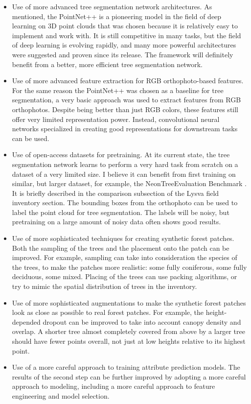 \begin{itemize}
\item Use of more advanced tree segmentation network architectures.
  As mentioned, the PointNet++ is a pioneering model in the field of deep learning on 3D point clouds that was chosen because it is relatively easy to implement and work with.
  It is still competitive in many tasks, but the field of deep learning is evolving rapidly, and many more powerful architectures were suggested and proven since its release.
  The framework will definitely benefit from a better, more efficient tree segmentation network.
\item Use of more advanced feature extraction for RGB orthophoto-based features.
  For the same reason the PointNet++ was chosen as a baseline for tree segmentation, a very basic approach was used to extract features from RGB orthophotos.
  Despite being better than just RGB colors, these features still offer very limited representation power.
  Instead, convolutional neural networks specialized in creating good representations for downstream tasks can be used.
\item Use of open-access datasets for pretraining.
  At its current state, the tree segmentation network learns to perform a very hard task from scratch on a dataset of a very limited size.
  I believe it can benefit from first training on similar, but larger dataset, for example, the NeonTreeEvaluation Benchmark \citep{weinsteinDataNeonTreeEvaluationBenchmark2022}.
  It is briefly described in the comparison subsection of the Lysva field inventory section.
  The bounding boxes from the orthophoto can be used to label the point cloud for tree segmentation.
  The labels will be noisy, but pretraining on a large amount of noisy data often shows good results.
\item Use of more sophisticated techniques for creating synthetic forest patches.
  Both the sampling of the trees and the placement onto the patch can be improved.
  For example, sampling can take into consideration the species of the trees, to make the patches more realistic: some fully coniferous, some fully deciduous, some mixed.
  Placing of the trees can use packing algorithms, or try to mimic the spatial distribution of trees in the inventory.
\item Use of more sophisticated augmentations to make the synthetic forest patches look as close as possible to real forest patches.
  For example, the height-depended dropout can be improved to take into account canopy density and overlap.
  A shorter tree almost completely covered from above by a larger tree should have fewer points overall, not just at low heights relative to its highest point.
\item Use of a more careful approach to training attribute prediction models.
The results of the second step can be further improved by adopting a more careful approach to modeling, including a more careful approach to feature engineering and model selection.

\end{itemize}
